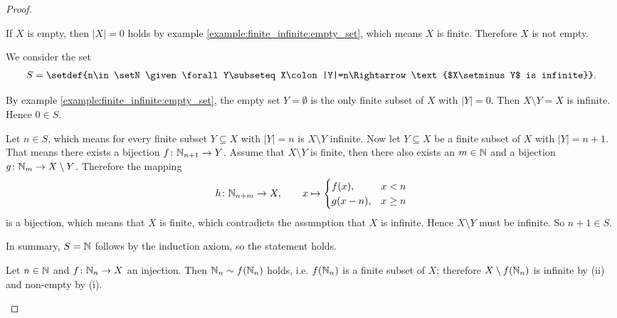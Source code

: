 \begin{proof}
    \begin{proofenumerate}
        \item If $X$ is empty, then $|X|=0$ holds by example \ref{example:finite_infinite:empty_set}, which means $X$ is finite. Therefore $X$ is not empty.
        
        \item We consider the set
        \begin{align}S=\setdef{n\in\setN\given \forall Y\subseteq X\colon |Y|=n\Rightarrow \text{$X\setminus Y$ is infinite}}.\end{align}

         By example \ref{example:finite_infinite:empty_set}, the empty set $Y=\emptyset$ is the only finite subset of $X$ with $|Y|=0$. Then $X\setminus Y=X$ is infinite. Hence $0\in S$.

         Let $n\in S$, which means for every finite subset $Y\subseteq X$ with $|Y|=n$ is $X\setminus Y$ infinite. Now let $Y\subseteq X$ be a finite subset of $X$ with $|Y|=n+1$. That means there exists a bijection $f\colon\mathbb{N}_{n+1}\to Y$. Assume that $X\setminus Y$ is finite, then there also exists an $m\in\mathbb{N}$ and a bijection $g\colon \mathbb{N}_m\to X\setminus Y$. Therefore the mapping
        \begin{align}h\colon \mathbb{N}_{n+m}\to X,\qquad x\mapsto \begin{cases}f(x), & x<n \\ g(x-n), & x\geq n\end{cases}\end{align}
        is a bijection, which means that $X$ is finite, which contradicts the assumption that $X$ is infinite. Hence $X\setminus Y$ must be infinite. So $n+1\in S$.

        In summary, $S=\mathbb{N}$ follows by the induction axiom, so the statement holds.

        \item Let $n\in\mathbb{N}$ and $f\colon\mathbb{N}_n\to X$ an injection. Then $\mathbb{N}_n\sim f(\mathbb{N}_n)$ holds, i.e. $f(\mathbb{N}_n)$ is a finite subset of $X$; therefore $X\setminus f(\mathbb{N}_n)$ is infinite by (ii) and non-empty by (i).
    \end{proofenumerate}
\end{proof}

